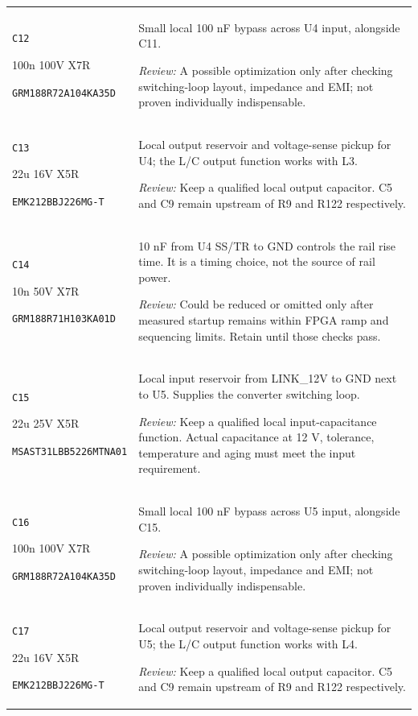 \documentclass[10pt,a4paper]{article}
\begin{document}
\begin{longtable}{@{}P{46mm}P{117mm}@{}}
\nolinkurl{C12}\par 100n 100V X7R\par\scriptsize \nolinkurl{GRM188R72A104KA35D} & Small local 100 nF bypass across U4 input, alongside C11.\par\smallskip\textit{Review:} A possible optimization only after checking switching-loop layout, impedance and EMI; not proven individually indispensable. \\
\nolinkurl{C13}\par 22u 16V X5R\par\scriptsize \nolinkurl{EMK212BBJ226MG-T} & Local output reservoir and voltage-sense pickup for U4; the L/C output function works with L3.\par\smallskip\textit{Review:} Keep a qualified local output capacitor. C5 and C9 remain upstream of R9 and R122 respectively. \\
\nolinkurl{C14}\par 10n 50V X7R\par\scriptsize \nolinkurl{GRM188R71H103KA01D} & 10 nF from U4 SS/TR to GND controls the rail rise time. It is a timing choice, not the source of rail power.\par\smallskip\textit{Review:} Could be reduced or omitted only after measured startup remains within FPGA ramp and sequencing limits. Retain until those checks pass. \\
\nolinkurl{C15}\par 22u 25V X5R\par\scriptsize \nolinkurl{MSAST31LBB5226MTNA01} & Local input reservoir from LINK\_12V to GND next to U5. Supplies the converter switching loop.\par\smallskip\textit{Review:} Keep a qualified local input-capacitance function. Actual capacitance at 12 V, tolerance, temperature and aging must meet the input requirement. \\
\nolinkurl{C16}\par 100n 100V X7R\par\scriptsize \nolinkurl{GRM188R72A104KA35D} & Small local 100 nF bypass across U5 input, alongside C15.\par\smallskip\textit{Review:} A possible optimization only after checking switching-loop layout, impedance and EMI; not proven individually indispensable. \\
\nolinkurl{C17}\par 22u 16V X5R\par\scriptsize \nolinkurl{EMK212BBJ226MG-T} & Local output reservoir and voltage-sense pickup for U5; the L/C output function works with L4.\par\smallskip\textit{Review:} Keep a qualified local output capacitor. C5 and C9 remain upstream of R9 and R122 respectively. \\

\end{longtable}
\end{document}
